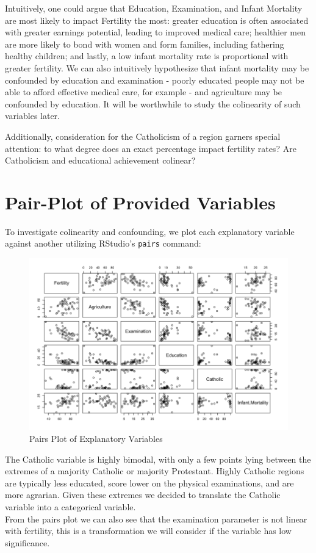 \documentclass[preprint,12pt]{elsarticle}
\begin{document}
Intuitively, one could argue that Education, Examination, and Infant Mortality are most likely to impact Fertility the most: greater education is often associated with greater earnings potential, leading to improved medical care; healthier men are more likely to bond with women and form families, including fathering healthy children; and lastly, a low infant mortality rate is proportional with greater fertility. We can also intuitively hypothesize that infant mortality may be confounded by education and examination - poorly educated people may not be able to afford effective medical care, for example - and agriculture may be confounded by education. It will be worthwhile to study the colinearity of such variables later. 

Additionally, consideration for the Catholicism of a region garners special attention: to what degree does an exact percentage impact fertility rates? Are Catholicism and educational achievement colinear? 

\section*{Pair-Plot of Provided Variables}

To investigate colinearity and confounding, we plot each explanatory variable against another utilizing RStudio's \texttt{pairs} command:

\begin{figure}[h]
\centering\includegraphics[width=0.8\linewidth]{Pairs}
\caption{Pairs Plot of Explanatory Variables}
\end{figure}

The Catholic variable is highly bimodal, with only a few points lying between the extremes of a majority Catholic or majority Protestant. Highly Catholic regions are typically less educated, score lower on the physical examinations, and are more agrarian. Given these extremes we decided to translate the Catholic variable into a categorical variable.\\
From the pairs plot we can also see that the examination parameter is not linear with fertility, this is a transformation we will consider if the variable has low significance.\\
\end{document}
